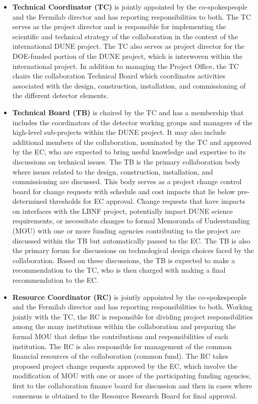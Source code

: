 \begin{itemize}
  \item \textbf{Technical Coordinator (TC)} is jointly appointed by the co-spokespeople and the Fermilab director and has reporting responsibilities to both.  The TC serves as the project director and is responsible for implementing the scientific and technical strategy of the collaboration in the context of the international DUNE project.  The TC also serves as project director for the DOE-funded portion of the DUNE project, which is interwoven within the international project.  In addition to managing the Project Office, the TC chairs the collaboration Technical Board which coordinates activities associated with the design, construction, installation, and commissioning of the different detector elements.   
  \item \textbf{Technical Board (TB)} is chaired by the TC and has a membership that includes the coordinators of the detector working groups and managers of the high-level sub-projects within the DUNE project.  It may also include additional members of the collaboration, nominated by the TC and approved by the EC, who are expected to bring useful knowledge and expertise to its discussions on technical issues.  The TB is the primary collaboration body where issues related to the design, construction, installation, and commissioning are discussed.  This body serves as a project change control board for change requests with schedule and cost impacts that lie below pre-determined thresholds for EC approval.  Change requests that have impacts on interfaces with the LBNF project,   potentially impact DUNE science requirements, or necessitate changes to formal Memoranda of Understanding (MOU) with one or more funding agencies contributing to the project are discussed within the TB but automatically passed to the EC.  The TB is also the primary forum for discussions on technological design choices faced by the collaboration.  Based on these discussions, the TB is expected to make a recommendation to the TC, who is then charged with making a final recommendation to the EC.           
  \item \textbf{Resource Coordinator (RC)} is jointly appointed by the co-spokespeople and the Fermilab director and has reporting responsibilities to both.  Working jointly with the TC, the RC is responsible for dividing project responsibilities among the many institutions within the collaboration and preparing the formal MOU that define the contributions and responsibilities of each institution.  The RC is also responsible for management of the common financial resources of the collaboration (common fund).  The RC takes proposed project change requests approved by the EC, which involve the modification of MOU with one or more of the participating funding agencies, first to the collaboration finance board for discussion and then in cases where consensus is obtained to the Resource Research Board for final approval.  

\end{itemize}
